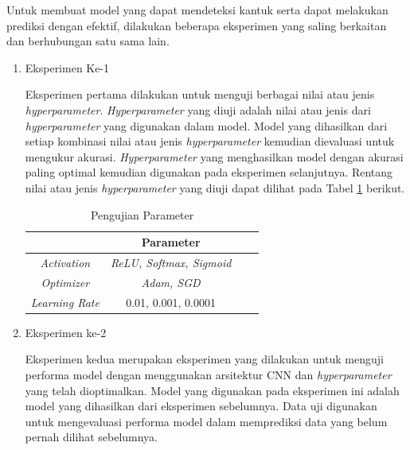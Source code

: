     Untuk membuat model yang dapat mendeteksi kantuk serta dapat melakukan prediksi dengan efektif, dilakukan beberapa eksperimen yang saling berkaitan dan berhubungan satu sama lain.

     \begin{enumerate}
  
        \item Eksperimen Ke-1

        Eksperimen pertama dilakukan untuk menguji berbagai nilai atau jenis \textit{hyperparameter}. \textit{Hyperparameter} yang diuji adalah nilai atau jenis dari \textit{hyperparameter} yang digunakan dalam model. Model yang dihasilkan dari setiap kombinasi nilai atau jenis \textit{hyperparameter} kemudian dievaluasi untuk mengukur akurasi. \textit{Hyperparameter} yang menghasilkan model dengan akurasi paling optimal kemudian digunakan pada eksperimen selanjutnya. Rentang nilai atau jenis \textit{hyperparameter} yang diuji dapat dilihat pada Tabel \ref{Pengujian Parameter} berikut.



            \begin{table}[h]
            \centering
            \caption{Pengujian Parameter}
            \begin{tabular}{cccc}
                \toprule
                \textbf{} & \textbf{Parameter} \\
                \midrule
                      
                          \textit{Activation}  &  \textit{ReLU, Softmax, Sigmoid }\\
                         \textit{Optimizer} &  \textit{Adam, SGD} \\
                          \textit{Learning Rate} &  0.01, 0.001, 0.0001 \\
            
                \bottomrule
            \end{tabular}
            \label{Pengujian Parameter}
        \end{table}
        
        
        \item Eksperimen ke-2

        Eksperimen kedua merupakan eksperimen yang dilakukan untuk menguji performa model dengan menggunakan arsitektur CNN dan \textit{hyperparameter} yang telah dioptimalkan. Model yang digunakan pada eksperimen ini adalah model yang dihasilkan dari eksperimen sebelumnya. Data uji digunakan untuk mengevaluasi performa model dalam memprediksi data yang belum pernah dilihat sebelumnya.

        
       
    \end{enumerate}




